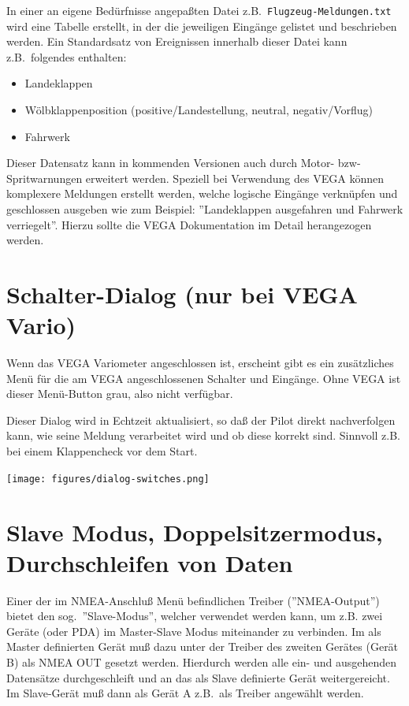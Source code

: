 In einer an eigene Bedürfnisse angepaßten Datei z.B.\ \texttt{Flugzeug-Meldungen.txt} wird eine Tabelle erstellt, in der die jeweiligen Eingänge gelistet und beschrieben werden. Ein Standardsatz von Ereignissen innerhalb dieser Datei  kann z.B.\ folgendes enthalten:
\begin{itemize}
  \item Landeklappen
  \item Wölbklappenposition (positive/Landestellung, neutral, negativ/Vorflug)
  \item Fahrwerk
\end{itemize}

Dieser Datensatz kann in kommenden Versionen auch durch Motor- bzw- Spritwarnungen erweitert werden.
Speziell bei Verwendung des VEGA können komplexere Meldungen erstellt werden, welche logische Eingänge verknüpfen und geschlossen ausgeben wie zum Beispiel: ''Landeklappen ausgefahren und Fahrwerk verriegelt''. 
Hierzu sollte die VEGA Dokumentation im Detail herangezogen werden.
\section{Schalter-Dialog (\textbf{nur} bei VEGA Vario)}

Wenn das VEGA Variometer angeschlossen ist, erscheint gibt es ein zusätzliches
Menü für die am VEGA angeschlossenen Schalter und Eingänge. Ohne VEGA ist dieser Menü-Button grau, also nicht verfügbar. 


Dieser Dialog wird in Echtzeit aktualisiert, so daß der Pilot  direkt 
nachverfolgen kann, wie seine Meldung verarbeitet wird und ob diese korrekt sind. 
Sinnvoll z.B. bei einem Klappencheck vor dem Start.


\begin{center}
\texttt{[image: figures/dialog-switches.png]}
\end{center}
\section{Slave Modus, Doppelsitzermodus, Durchschleifen von Daten}

Einer der im NMEA-Anschluß Menü befindlichen Treiber (''NMEA-Output'')
bietet den 
sog.\  ''Slave-Modus'', welcher verwendet werden kann,  um z.B. zwei Geräte  (\al oder \textsf{PDA})  im Master-Slave Modus miteinander zu verbinden. 
Im als Master definierten Gerät muß dazu unter der Treiber des zweiten  Gerätes (Gerät B) als NMEA OUT gesetzt werden.
Hierdurch werden alle ein- und ausgehenden Datensätze  durchgeschleift und an das als Slave definierte Gerät weitergereicht.
Im Slave-Gerät muß dann als Gerät A z.B.\ \fl als Treiber angewählt werden.


